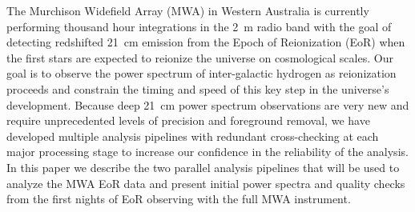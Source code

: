 The Murchison Widefield Array (MWA) in Western Australia is currently
performing thousand hour integrations in the 2~m radio band with the goal of
detecting redshifted 21~cm emission from the Epoch of Reionization
(EoR) when the first stars are expected to reionize the
universe on cosmological scales. Our goal is to observe the power spectrum of inter-galactic hydrogen as reionization
proceeds and constrain the timing and speed of this key step in the universe’s development. Because deep 21~cm power spectrum observations are very new and require unprecedented levels of precision and foreground removal, we have developed multiple analysis pipelines with redundant cross-checking at each major processing stage to increase our confidence in the reliability of the analysis. In this paper we describe the two parallel analysis pipelines that will be used to analyze the MWA EoR data and present initial power spectra and quality checks from the first nights of EoR observing with the full MWA instrument.